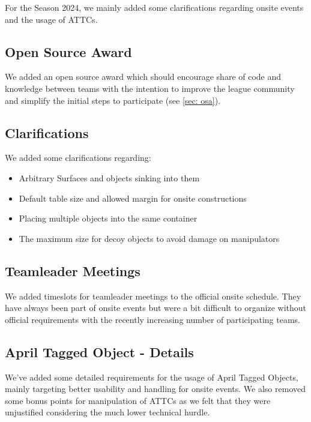 For the Season 2024, we mainly added some clarifications regarding onsite events and the usage of ATTCs.

\subsection{Open Source Award}

We added an open source award which should encourage share of code and knowledge between teams with the intention to improve the league community and simplify the initial steps to participate (see \ref{sec: osa}).

\subsection{Clarifications}

We added some clarifications regarding:

\begin{itemize}
	\item Arbitrary Surfaces and objects sinking into them
	\item Default table size and allowed margin for onsite constructions
	\item Placing multiple objects into the same container
	\item The maximum size for decoy objects to avoid damage on manipulators
\end{itemize}

\subsection{Teamleader Meetings}

We added timeslots for teamleader meetings to the official onsite schedule.
They have always been part of onsite events but were a bit difficult to organize without official requirements 
with the recently increasing number of participating teams.

\subsection{April Tagged Object - Details}

We've added some detailed requirements for the usage of April Tagged Objects,
mainly targeting better usability and handling for onsite events.
We also removed some bonus points for manipulation of ATTCs as we felt that they were unjustified
considering the much lower technical hurdle.

